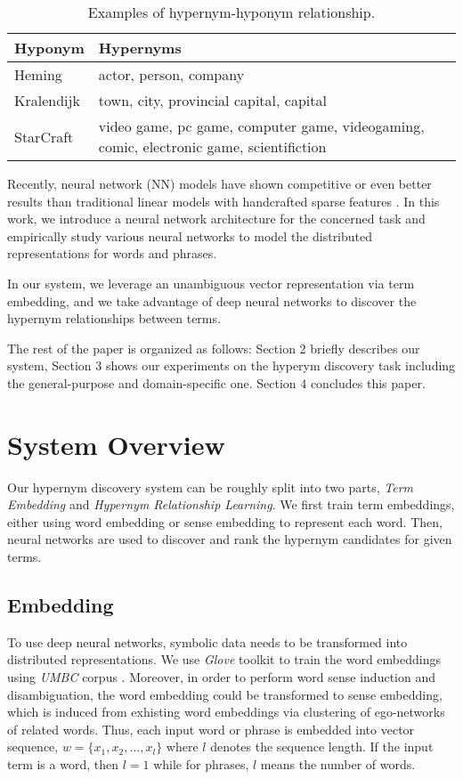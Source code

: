 \documentclass[11pt,a4paper]{article}
\begin{document}
	\begin{table}[h]\small
	\centering
	{\small
		\begin{tabular}{|l|p{5.4cm}|}
		\hline
		Hyponym & Hypernyms \\
		\hline
		Heming & actor, person, company\\
		\hline
		Kralendijk & town, city, provincial capital, capital\\
		\hline
		StarCraft & video game, pc game, computer game, videogaming, comic,	electronic game, scientifiction \\
		\hline
		\end{tabular}
	}
	\caption{\label{tab:example} Examples of hypernym-hyponym relationship.}
	\end{table}
	
	Recently, neural network (NN) models have shown competitive or even better results than traditional linear models with handcrafted sparse features \cite{Qin2016A,Pang2016I,Qin2016Shallow,Wang2016Connecting,Zhao2017A,Wang2017A,Qin2017Adversarial,Cai2017Pair,Zhao2017B,Li2018}. In this work, we introduce a neural network architecture for the concerned task and empirically study various neural networks to model the distributed representations for words and phrases. 
	
	In our system, we leverage an unambiguous vector representation via term embedding, and we take advantage of deep neural networks to discover the hypernym relationships between terms.
	
	The rest of the paper is organized as follows: Section 2 briefly describes our system, Section 3 shows our experiments on the hyperym discovery task including the general-purpose and domain-specific one. Section 4 concludes this paper.
	
	\section{System Overview}
	Our hypernym discovery system can be roughly split into two parts, \emph{Term Embedding} and \emph{Hypernym Relationship Learning}. We first train term embeddings, either using word embedding or sense embedding to represent each word. Then, neural networks are used to discover and rank the hypernym candidates for given terms.
	\subsection{Embedding}
	To use deep neural networks, symbolic data needs to be transformed into distributed representations\cite{Wang2016Learning,Qin2016A,Cai2016Neural,Zhang2016Probabilistic,Wang2016Converting,Wang2015Bilingual,Cai2017Fast}. We use \emph{Glove} toolkit to train the word embeddings using \emph{UMBC} corpus \cite{Han2013UMBC}. Moreover, in order to perform word sense induction and disambiguation, the word embedding could be transformed to sense embedding, which is induced from exhisting word embeddings via clustering of ego-networks \cite{pelevina-EtAl:2016:RepL4NLP} of related words. Thus, each input word or phrase is embedded into vector sequence, $w = \{x_{1},x_{2},\dots,x_{l}\}$ where $l$ denotes the sequence length. If the input term is a word, then $l=1$ while for phrases, $l$ means the number of words.
	
\end{document}
